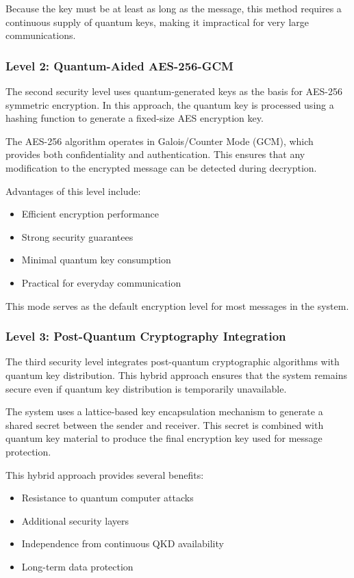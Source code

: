 \documentclass[conference]{IEEEtran}
\begin{document}
Because the key must be at least as long as the message, this method requires a continuous supply of quantum keys, making it impractical for very large communications.

\subsubsection{Level 2: Quantum-Aided AES-256-GCM}

The second security level uses quantum-generated keys as the basis for AES-256 symmetric encryption. In this approach, the quantum key is processed using a hashing function to generate a fixed-size AES encryption key.

The AES-256 algorithm operates in Galois/Counter Mode (GCM), which provides both confidentiality and authentication. This ensures that any modification to the encrypted message can be detected during decryption.

Advantages of this level include:
\begin{itemize}
    \item Efficient encryption performance
    \item Strong security guarantees
    \item Minimal quantum key consumption
    \item Practical for everyday communication
\end{itemize}

This mode serves as the default encryption level for most messages in the system.

\subsubsection{Level 3: Post-Quantum Cryptography Integration}

The third security level integrates post-quantum cryptographic algorithms with quantum key distribution. This hybrid approach ensures that the system remains secure even if quantum key distribution is temporarily unavailable.

The system uses a lattice-based key encapsulation mechanism to generate a shared secret between the sender and receiver. This secret is combined with quantum key material to produce the final encryption key used for message protection.

This hybrid approach provides several benefits:
\begin{itemize}
    \item Resistance to quantum computer attacks
    \item Additional security layers
    \item Independence from continuous QKD availability
    \item Long-term data protection
\end{itemize}
\end{document}
